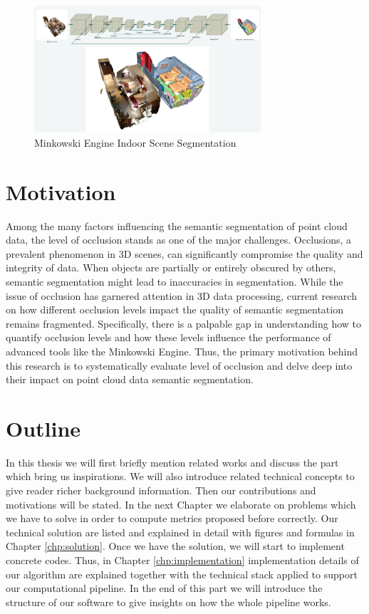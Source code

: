 \documentclass[11pt, a4paper,oneside,chapterprefix=false]{scrbook}
\begin{document}
\begin{figure}[h]
    \centering
    \includegraphics*[width=0.75\textwidth]{figures/Minkowski Engine.png}
    \caption{Minkowski Engine Indoor Scene Segmentation}
    \label{fig:minkowski}
\end{figure}


\section{Motivation} \label{sec:motivation}

Among the many factors influencing the semantic segmentation of point cloud data, the level of occlusion stands as one of the major challenges. Occlusions, a prevalent phenomenon in 3D scenes, can significantly compromise the quality and integrity of data. When objects are partially or entirely obscured by others, semantic segmentation might lead to inaccuracies in segmentation. While the issue of occlusion has garnered attention in 3D data processing, current research on how different occlusion levels impact the quality of semantic segmentation remains fragmented. Specifically, there is a palpable gap in understanding how to quantify occlusion levels and how these levels influence the performance of advanced tools like the Minkowski Engine. Thus, the primary motivation behind this research is to systematically evaluate level of occlusion and delve deep into their impact on point cloud data semantic segmentation.

\section{Outline} \label{sec:outline}

In this thesis we will first briefly mention related works and discuss the part which bring us inspirations. We will also introduce related technical concepts to give reader richer background information. Then our contributions and motivations will be stated. In the next Chapter we elaborate on problems which we have to solve in order to compute metrics proposed before correctly. Our technical solution are listed and explained in detail with figures and formulas in Chapter \ref{chp:solution}. Once we have the solution, we will start to implement concrete codes. Thus, in Chapter \ref{chp:implementation} implementation details of our algorithm are explained together with the technical stack applied to support our computational pipeline. In the end of this part we will introduce the structure of our software to give insights on how the whole pipeline works.
\end{document}
